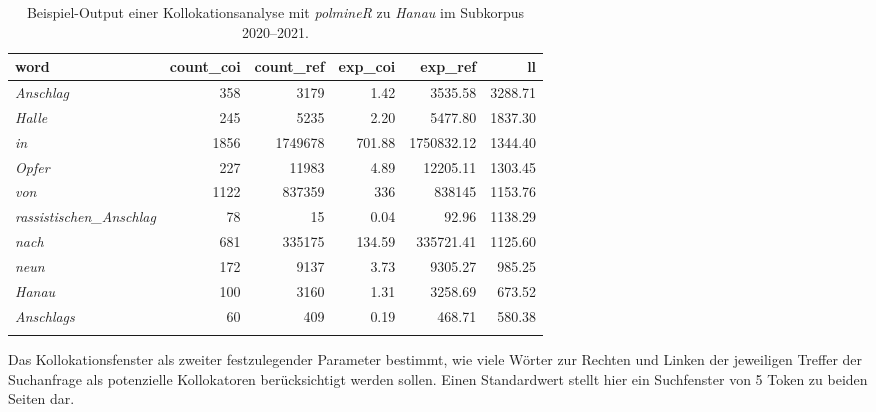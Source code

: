 \begin{table}
\caption{Beispiel-Output einer Kollokationsanalyse mit \emph{polmineR} zu \emph{Hanau} im Subkorpus 2020--2021.}
\small
\label{tab:collocation_analysis}
 \begin{tabular}{lrrrrr}
  \lsptoprule
  word & count\_coi & count\_ref & exp\_coi & exp\_ref & ll \\
  \midrule
  \emph{Anschlag}              & 358   & 3179    & 1.42   & 3535.58   & 3288.71 \\
  \emph{Halle}                 & 245   & 5235    & 2.20   & 5477.80   & 1837.30 \\
  \emph{in}                    & 1856  & 1749678 & 701.88 & 1750832.12 & 1344.40 \\
  \emph{Opfer}                 & 227   & 11983   & 4.89   & 12205.11  & 1303.45 \\
  \emph{von}                   & 1122  & 837359  & 336    & 838145    & 1153.76 \\
  \emph{rassistischen\_Anschlag} & 78  & 15      & 0.04   & 92.96     & 1138.29 \\
  \emph{nach}                  & 681   & 335175  & 134.59 & 335721.41 & 1125.60 \\
  \emph{neun}                  & 172   & 9137    & 3.73   & 9305.27   & 985.25 \\
  \emph{Hanau}                 & 100   & 3160    & 1.31   & 3258.69   & 673.52 \\
  \emph{Anschlags}             & 60    & 409     & 0.19   & 468.71    & 580.38 \\
  \lspbottomrule
 \end{tabular}
\end{table}

Das Kollokationsfenster als zweiter festzulegender Parameter bestimmt, wie viele Wörter zur Rechten und Linken der jeweiligen Treffer der Suchanfrage als potenzielle Kollokatoren berücksichtigt werden sollen. Einen Standardwert stellt hier ein Suchfenster von 5 Token zu beiden Seiten dar.

